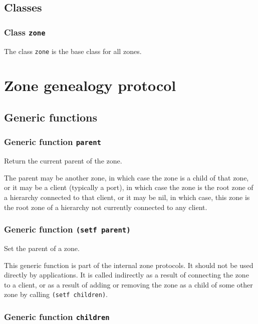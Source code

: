 \documentclass{report}
\begin{document}
\subsection{Classes}

\subsubsection{Class \texttt{zone}}

The class \texttt{zone} is the base class for all zones. 


\section{Zone genealogy protocol}

\subsection{Generic functions}

\subsubsection{Generic function \texttt{parent}}

Return the current parent of the zone. 

The parent may be another zone, in which case the zone is a child of
that zone, or it may be a client (typically a port), in which case the
zone is the root zone of a hierarchy connected to that client, or it
may be nil, in which case, this zone is the root zone of a hierarchy
not currently connected to any client.

\subsubsection{Generic function \texttt{(setf parent)}}

Set the parent of a zone.

This generic function is part of the internal zone protocols.  It
should not be used directly by applications.  It is called indirectly
as a result of connecting the zone to a client, or as a result of
adding or removing the zone as a child of some other zone by calling
\texttt{(setf children)}.

\subsubsection{Generic function \texttt{children}}
\end{document}
